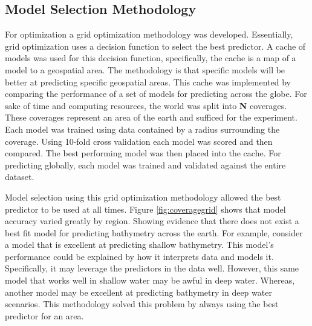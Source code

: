 \subsection{Model Selection Methodology}
\setlength{\parindent}{10ex}
For optimization a grid optimization methodology was developed.
Essentially, grid optimization uses a decision function to select the best predictor.
A cache of models was used for this decision function, specifically, the cache is a map of a model to a geospatial area.
The methodology is that specific models will be better at predicting specific geospatial areas.
This cache was implemented by comparing the performance of a set of models for predicting across the globe.
For sake of time and computing resources, the world was split into \textbf{N} coverages.
These coverages represent an area of the earth and sufficed for the experiment.
Each model was trained using data contained by a radius surrounding the coverage.
Using 10-fold cross validation each model was scored and then compared.
The best performing model was then placed into the cache.
For predicting globally, each model was trained and validated against the entire dataset.

Model selection using this grid optimization methodology allowed the best predictor to be used at all times.
Figure \ref{fig:coveragegrid} shows that model accuracy varied greatly by region.
Showing evidence that there does not exist a best fit model for predicting bathymetry across the earth.
For example, consider a model that is excellent at predicting shallow bathymetry.
This model's performance could be explained by how it interprets data and models it.
Specifically, it may leverage the predictors in the data well.
However, this same model that works well in shallow water may be awful in deep water.
Whereas, another model may be excellent at predicting bathymetry in deep water scenarios.
This methodology solved this problem by always using the best predictor for an area.